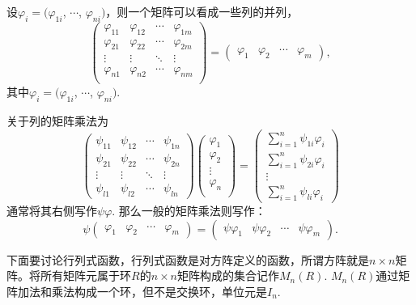 设$\varphi_{i}=(\varphi_{1i}$, $\cdots$, $\varphi_{ni})$，则一个矩阵可以看成一些列的并列，
\[
	\begin{pmatrix}
	\varphi_{11} & \varphi_{12} & \cdots & \varphi_{1m}\\
	\varphi_{21} & \varphi_{22} & \cdots & \varphi_{2m}\\
	\vdots & \vdots & \ddots & \vdots \\
	\varphi_{n1} & \varphi_{n2} & \cdots & \varphi_{nm}\\
	\end{pmatrix}
	=
	\begin{pmatrix}
	\varphi_{1} & \varphi_{2} & \cdots & \varphi_{m}
	\end{pmatrix},
\]
其中$\varphi_i=(\varphi_{1i}$, $\cdots$, $\varphi_{ni})$. 

关于列的矩阵乘法为
\begin{equation}
\begin{pmatrix}
	\psi_{11} & \psi_{12} & \cdots & \psi_{1n}\\
	\psi_{21} & \psi_{22} & \cdots & \psi_{2n}\\
	\vdots & \vdots & \ddots & \vdots \\
	\psi_{l1} & \psi_{l2} & \cdots & \psi_{ln}
\end{pmatrix}
\begin{pmatrix}
	\varphi_{1} \\
	\varphi_{2}  \\
	\vdots \\
	\varphi_{n} \\
\end{pmatrix}
=
\begin{pmatrix}
	\sum_{i=1}^n \psi_{1i}\varphi_{i}\\
	\sum_{i=1}^n \psi_{2i}\varphi_{i} \\
	\vdots \\
	\sum_{i=1}^n \psi_{li}\varphi_{i}
\end{pmatrix}
\end{equation}
通常将其右侧写作$\psi\varphi$. 那么一般的矩阵乘法则写作：
\[
	\psi
	\begin{pmatrix}
	\varphi_{1} & \varphi_{2} & \cdots & \varphi_{m}
	\end{pmatrix}
	=
	\begin{pmatrix}
	\psi\varphi_{1} & \psi\varphi_{2} & \cdots & \psi\varphi_{m}
	\end{pmatrix}.
\]

\para 下面要讨论行列式函数，行列式函数是对方阵定义的函数，所谓方阵就是$n\times n$矩阵。将所有矩阵元属于环$R$的$n\times n$矩阵构成的集合记作$M_n(R)$. $M_n(R)$通过矩阵加法和乘法构成一个环，但不是交换环，单位元是$I_n$. 

